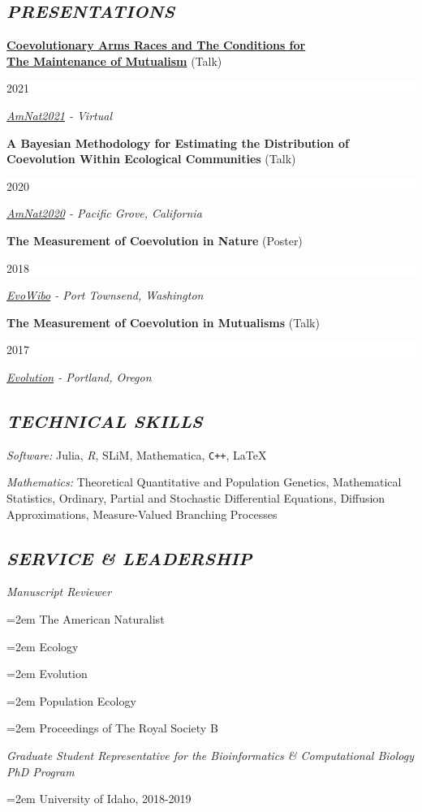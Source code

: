 \documentclass[paper=a4,fontsize=11pt]{scrartcl} %
\newlength{\spacebox}
\newcommand{\sepspace}{\vspace*{1em}}		%
\newcommand{\NewPart}[1]{\subsection*{\uppercase{#1}}}
\newcommand{\PersonalEntry}[2]{
\noindent\hangindent=2em\hangafter=0 %
\parbox{\spacebox}{        %
\textit{#1}}		       %
\hspace{1.5em} #2 \par}    %
\newcommand{\SkillsEntry}[2]{      %
\noindent \textit{#1} #2 %
\normalsize \par}
\newcommand{\PresentationEntry}[4]{
\noindent \textbf{#1} (#2) \hfill      %
\colorbox{White}{%
\parbox{6em}{%
\hfill\color{Black}#3}} \par  %
\noindent \textit{#4}
\normalsize \par}
\newcommand{\ServiceTopic}[1]{
\noindent \textit{#1}\par
}
\newcommand{\ReviewEntry}[1]{
\noindent\hangindent=2em\hangafter=0 #1 %
\normalsize \par}
\begin{document}
\NewPart{\emph{Presentations}}{}

\PresentationEntry{\href{https://youtu.be/8ApmFjOkKQU?t=14445}{Coevolutionary Arms Races and The Conditions for \\ The Maintenance of Mutualism}}{Talk}{2021}{\href{https://virtualasilomar2021.org/}{AmNat2021} - Virtual}
\sepspace
\PresentationEntry{A Bayesian Methodology for Estimating the Distribution of \\ Coevolution Within
Ecological Communities}{Talk}{2020}{\href{https://amnat2020.com/}{AmNat2020} - Pacific Grove, California}
\sepspace
\PresentationEntry{The Measurement of Coevolution in Nature}{Poster}{2018}{\href{https://www.zoology.ubc.ca/evo-wibo/}{EvoWibo} - Port Townsend, Washington}
\sepspace
\PresentationEntry{The Measurement of Coevolution in Mutualisms}{Talk}{2017}{\href{http://www.evolutionmeetings.org/}{Evolution} - Portland, Oregon}

\NewPart{\emph{Technical Skills}}{}

\SkillsEntry{Software: }{Julia, \textit{R}, SLiM, Mathematica, \texttt{C++}, \LaTeX}
\SkillsEntry{Mathematics: }{Theoretical Quantitative and Population Genetics, Mathematical Statistics, Ordinary, Partial and Stochastic Differential Equations, Diffusion Approximations, Measure-Valued Branching Processes}

\NewPart{\emph{Service \& Leadership}}{}

\ServiceTopic{Manuscript Reviewer}
\ReviewEntry{The American Naturalist}
\ReviewEntry{Ecology}
\ReviewEntry{Evolution}
\ReviewEntry{Population Ecology}
\ReviewEntry{Proceedings of The Royal Society B}

\ServiceTopic{Graduate Student Representative for the Bioinformatics \& Computational Biology PhD Program}
\ReviewEntry{University of Idaho, 2018-2019}
\end{document}
